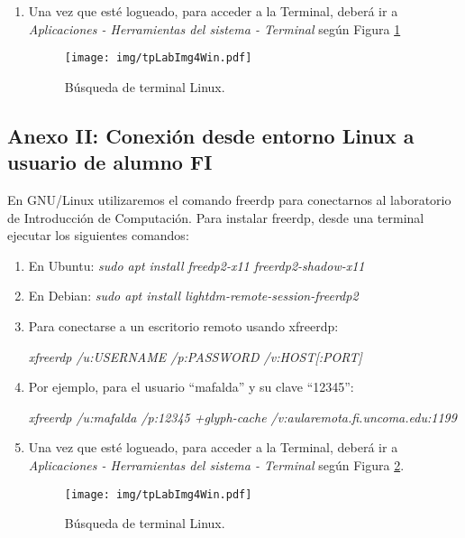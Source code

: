 \documentclass[12pt]{article}
\begin{document}
\begin{enumerate}
\item Una vez que esté logueado, para acceder a la Terminal, deberá ir a
    \emph{Aplicaciones - Herramientas del sistema - Terminal} según Figura
        \ref{terminalLinux}

\begin{figure}[!htb]

    \centering

    \texttt{[image: img/tpLabImg4Win.pdf]}

    \caption{Búsqueda de terminal Linux.}

    \label{terminalLinux}

\end{figure}
\end{enumerate}

\clearpage

\subsection{Anexo II: Conexión desde entorno Linux a usuario de alumno FI}

\label{subsec:anexoII}

En GNU/Linux utilizaremos el comando freerdp para conectarnos al laboratorio
de Introducción de Computación. Para instalar freerdp, desde una terminal
ejecutar los siguientes comandos:\\

\begin{enumerate}

\item En Ubuntu: \emph{sudo apt install freedp2-x11 freerdp2-shadow-x11}

\item En Debian: \emph{sudo apt install lightdm-remote-session-freerdp2}

\item Para conectarse a un escritorio remoto usando xfreerdp:

\emph{ xfreerdp /u:USERNAME /p:PASSWORD /v:HOST[:PORT]}

\item Por ejemplo, para el usuario “mafalda” y su clave “12345”:

\emph{xfreerdp /u:mafalda /p:12345 +glyph-cache /v:aularemota.fi.uncoma.edu:1199}

\item Una vez que esté logueado, para acceder a la Terminal, deberá ir a
    \emph{Aplicaciones - Herramientas del sistema - Terminal} según Figura
        \ref{terminalLinuxEnLinux}.

\begin{figure}[!htb]

    \centering

    \texttt{[image: img/tpLabImg4Win.pdf]}

    \caption{Búsqueda de terminal Linux.}

    \label{terminalLinuxEnLinux}

\end{figure}

\end{enumerate}
\end{document}
